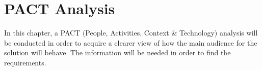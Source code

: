 





\chapter{PACT Analysis}
In this chapter, a PACT (People, Activities, Context \& Technology) analysis will be conducted in order to acquire a clearer view of how the main audience for the solution will behave. The information will be needed in order to find the requirements.



